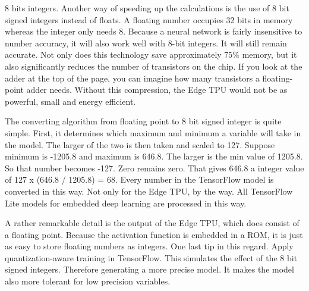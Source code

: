 8 bits integers.
Another way of speeding up the calculations is the use of 8 bit signed integers instead of floats. A floating number occupies 32 bits in memory whereas the integer only needs 8. Because a neural network is fairly insensitive to number accuracy, it will also work well with 8-bit integers. It will still remain accurate. Not only does this technology save approximately $75\%$ memory, but it also significantly reduces the number of transistors on the chip. If you look at the adder at the top of the page, you can imagine how many transistors a floating-point adder needs. Without this compression, the Edge TPU would not be as powerful, small and energy efficient.

The converting algorithm from floating point to 8 bit signed integer is quite simple. First, it determines which maximum and minimum a variable will take in the model. The larger of the two is then taken and scaled to 127. Suppose minimum is -1205.8 and maximum is 646.8. The larger is the min value of 1205.8. So that number becomes -127. Zero remains zero. That gives 646.8 a integer value of 127 x (646.8 / 1205.8)  = 68. Every number in the TensorFlow model is converted in this way. Not only for the Edge TPU, by the way. All TensorFlow Lite models for embedded deep learning are processed in this way.

A rather remarkable detail is the output of the Edge TPU, which does consist of a floating point.
Because the activation function is embedded in a ROM, it is just as easy to store floating numbers as integers.
One last tip in this regard. Apply quantization-aware training in TensorFlow. This simulates the effect of the 8 bit signed integers. Therefore generating a more precise model. It makes the model also more tolerant for low precision variables.